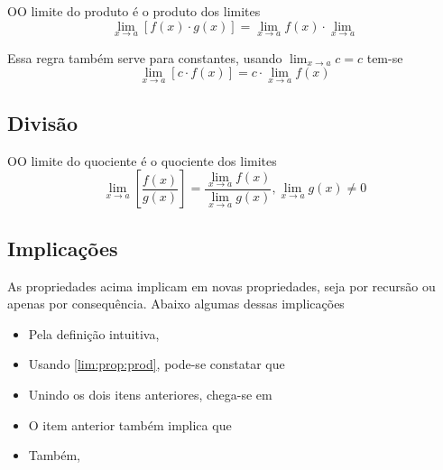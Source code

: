 \begin{defin}
OO limite do produto é o produto dos limites
\begin{equation}
  \lim_{x\to a} [f(x)\cdot g(x)] = \lim_{x\to a} f(x) \cdot \lim_{x\to a}
\end{equation}

Essa regra também serve para constantes, usando $\lim_{x\to a} c = c$ tem-se
\begin{equation}
\lim_{x\to a} [c\cdot f(x)] = c\cdot \lim_{x\to a} f(x)
\end{equation}
\label{lim:prop:prod}
\end{defin}

\subsection{Divisão}
\vspace{0.3cm}

\begin{defin}
  OO limite do quociente é o quociente dos limites
  \begin{equation}
    \lim_{x\to a} \left[\frac{f(x)}{g(x)}\right] = \frac{\lim_{x\to a} f(x)}{\lim_{x\to a} g(x)}, \lim_{x\to a} g(x)\neq 0
  \end{equation}
  \label{lim:prop:quoc}
\end{defin}

\subsection{Implicações}

As propriedades acima implicam em novas propriedades, seja por recursão ou apenas por consequência. Abaixo algumas dessas implicações

\begin{itemize}
  \item Pela definição intuitiva, 
  \item Usando \ref{lim:prop:prod}, pode-se constatar que 
  \item Unindo os dois itens anteriores, chega-se em 
  \item O item anterior também implica que 
  \item Também, 
\end{itemize}

